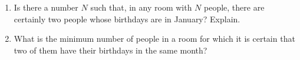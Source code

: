 \begin{enumerate}
\item[(a)] Is there a number $N$ such that, in any room with $N$ people, there are certainly two people whose birthdays are in January? Explain.
\item[(b)] What is the minimum number of people in a room for which it is certain that two of them have their birthdays in the same month?
\end{enumerate}
